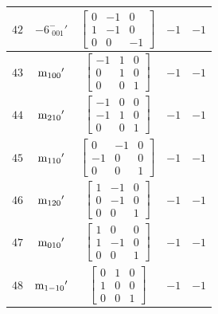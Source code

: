 \documentclass[fleqn,8pt]{jsarticle}
\begin{document}
\begin{longtable}{ccccc}
$ 42 $ & $ -6^{-}_{\,\,001}{}' $ & $ \begin{bmatrix} 0 & -1 & 0 \\ 1 & -1 & 0 \\ 0 & 0 & -1 \end{bmatrix} $ & $ -1 $ & $ -1 $ \\ \hline
$ 43 $ & $ {\rm m}_{100}{}' $ & $ \begin{bmatrix} -1 & 1 & 0 \\ 0 & 1 & 0 \\ 0 & 0 & 1 \end{bmatrix} $ & $ -1 $ & $ -1 $ \\ \hline
$ 44 $ & $ {\rm m}_{210}{}' $ & $ \begin{bmatrix} -1 & 0 & 0 \\ -1 & 1 & 0 \\ 0 & 0 & 1 \end{bmatrix} $ & $ -1 $ & $ -1 $ \\ \hline
$ 45 $ & $ {\rm m}_{110}{}' $ & $ \begin{bmatrix} 0 & -1 & 0 \\ -1 & 0 & 0 \\ 0 & 0 & 1 \end{bmatrix} $ & $ -1 $ & $ -1 $ \\ \hline
$ 46 $ & $ {\rm m}_{120}{}' $ & $ \begin{bmatrix} 1 & -1 & 0 \\ 0 & -1 & 0 \\ 0 & 0 & 1 \end{bmatrix} $ & $ -1 $ & $ -1 $ \\ \hline
$ 47 $ & $ {\rm m}_{010}{}' $ & $ \begin{bmatrix} 1 & 0 & 0 \\ 1 & -1 & 0 \\ 0 & 0 & 1 \end{bmatrix} $ & $ -1 $ & $ -1 $ \\ \hline
$ 48 $ & $ {\rm m}_{1-10}{}' $ & $ \begin{bmatrix} 0 & 1 & 0 \\ 1 & 0 & 0 \\ 0 & 0 & 1 \end{bmatrix} $ & $ -1 $ & $ -1 $ \\
\end{longtable}
\end{document}
